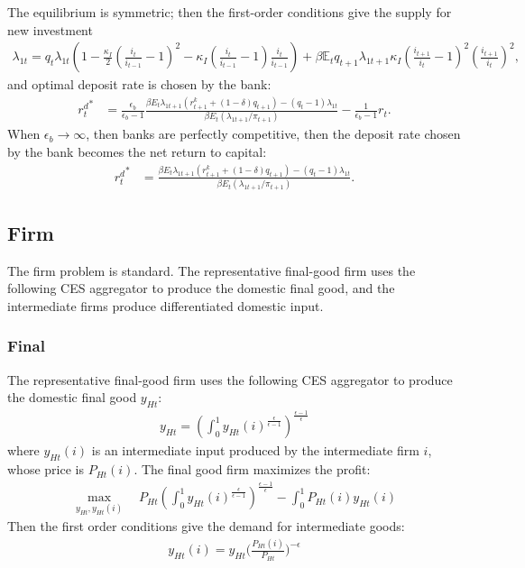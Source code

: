 \documentclass[12pt]{article}
\newcommand{\E}{\mathbb{E}}
\begin{document}
The equilibrium is symmetric; then the first-order conditions give the supply for new investment 
\begin{align*}
\lambda_{1t} = q_t\lambda_{1t}(1-\frac{\kappa_I}{2}(\frac{i_t}{i_{t-1}}-1)^2-\kappa_I(\frac{i_t}{i_{t-1}}-1)\frac{i_t}{i_{t-1}})+ \beta\E_tq_{t+1}\lambda_{1t+1}\kappa_I(\frac{i_{t+1}}{i_t}-1)^2(\frac{i_{t+1}}{i_t})^2,
\end{align*}
and optimal deposit rate is chosen by the bank:  
\begin{align*}
{r_{t}^d}^* &= \frac{\epsilon_b}{\epsilon_b-1}\frac{\beta E_t \lambda_{1t+1}(r_{t+1}^k+(1-\delta)q_{t+1})-(q_t-1)\lambda_{1t}}{\beta E_t (\lambda_{1t+1}/\pi_{t+1})}-\frac{1}{\epsilon_b-1}r_t.
\end{align*}
When $\epsilon_b \to \infty$, then banks are perfectly competitive, then the deposit rate chosen by the bank becomes the net return to capital: 
\begin{align*}
{r_{t}^d}^* &= \frac{\beta E_t \lambda_{1t+1}(r_{t+1}^k+(1-\delta)q_{t+1})-(q_t-1)\lambda_{1t}}{\beta E_t (\lambda_{1t+1}/\pi_{t+1})}.
\end{align*}

\subsection{Firm}
The firm problem is standard. The representative final-good firm uses the following CES aggregator to produce the domestic final good, and the intermediate firms produce differentiated domestic input. 

\subsubsection*{Final}
The representative final-good firm uses the following CES aggregator to produce the domestic final good $y_{Ht}$:
\begin{align*}
y_{Ht} = (\int_0^1 y_{Ht}(i)^{\frac{\epsilon}{\epsilon-1}})^{\frac{\epsilon-1}{\epsilon}}
\end{align*}
where $y_{Ht}(i)$ is an intermediate input produced by the intermediate firm $i$, whose price is $P_{Ht}(i)$. The final good firm maximizes the profit: 
\begin{align*}
\max_{y_{Ht},y_{Ht}(i)}\quad P_{Ht}(\int_0^1 y_{Ht}(i)^{\frac{\epsilon}{\epsilon-1}})^{\frac{\epsilon-1}{\epsilon}}- \int_0^1 P_{Ht}(i)y_{Ht}(i)
\end{align*}
Then the first order conditions give the demand for intermediate goods: 
\begin{align*}
y_{Ht}(i) = y_{Ht}\Big(\frac{P_{Ht}(i)}{P_{Ht}}\Big)^{-\epsilon}
\end{align*}
\end{document}
